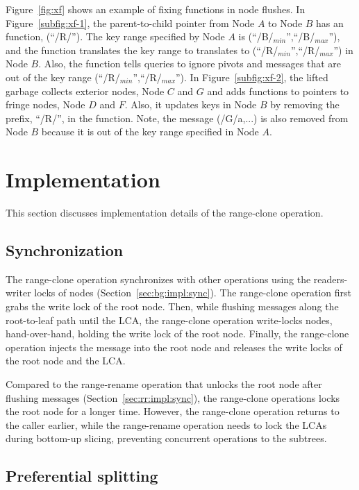 Figure~\ref{fig:xf} shows an example of fixing \xf functions in node flushes.
In Figure~\ref{subfig:xf-1}, the parent-to-child pointer from Node $A$ to
Node $B$ has an \xf function, \xf(``/R/'').
The key range specified by Node $A$ is (``/B/$_{min}$'',``/B/$_{max}$''),
and the \xf function translates the key range to
translates to (``/R/$_{min}$'',``/R/$_{max}$'') in Node $B$.
Also, the \xf function tells queries to ignore pivots and messages that are
out of the key range (``/R/$_{min}$'',``/R/$_{max}$'').
In Figure~\ref{subfig:xf-2}, the lifted \bedag garbage collects exterior nodes,
Node $C$ and $G$
and adds \xf functions to pointers to fringe nodes, Node $D$ and $F$.
Also, it updates keys in Node $B$ by removing the prefix, ``/R/'',
in the \xf function.
Note, the message \putm(/G/a,...) is also removed from Node $B$
because it is out of the key range specified in Node $A$.

\section{Implementation}
\label{sec:rc:impl}

This section discusses implementation details of the range-clone operation.

\subsection{Synchronization}

The range-clone operation synchronizes with other \bet operations using the
readers-writer locks of \bet nodes
(Section~\ref{sec:bg:impl:sync}).
The range-clone operation first grabs the write lock of the root node.
Then, while flushing messages along the root-to-leaf path until the LCA,
the range-clone operation write-locks \bet nodes, hand-over-hand,
holding the write lock of the root node.
Finally, the range-clone operation injects the \goto message into the root node
and releases the write locks of the root node and the LCA.

Compared to the range-rename operation that unlocks the root node after flushing
messages (Section~\ref{sec:rr:impl:sync}),
the range-clone operations locks the root node for a longer time.
However, the range-clone operation returns to the caller earlier,
while the range-rename operation needs to lock the LCAs during bottom-up
slicing, preventing concurrent operations to the subtrees.

\subsection{Preferential splitting}
\label{sec:rc:impl:pfsplit}

